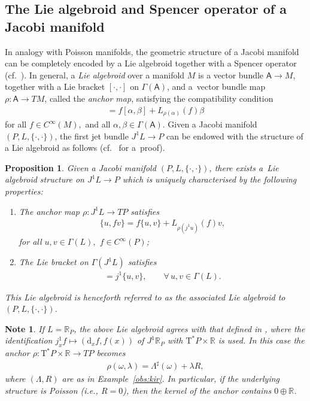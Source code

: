 \documentclass[10pt,a4paper]{amsart}
\numberwithin{equation}{section}
\newtheorem{Proposition}[Theorem]{Proposition}
\newtheorem{Note}[Theorem]{Note}
\newcommand{\de}{\mathrm{d}} %
\newcommand{\cotan}{\mathrm{T}^*} %
\newcommand{\RR}{\mathbb{R}}
\begin{document}
\subsection{The Lie algebroid and Spencer operator of a Jacobi manifold}\label{sec:lie-algebr-assoc}
In analogy with Poisson manifolds, the geometric structure of a Jacobi manifold can be completely encoded by a Lie algebroid together with a Spencer operator (cf.\ \cite{Maria-Crainic,Maria,Dazord,Kerbrat}). In general, a {\it Lie algebroid} over a manifold $M$ is a vector bundle $\mathsf{A} \to M$, together with a Lie bracket $[\cdot,\cdot]$ on $\Gamma(\mathsf{A})$, and a~vector bundle map $\rho\colon \mathsf{A}\to TM$, called the {\it anchor map}, satisfying the compatibility condition
\begin{gather*}[\alpha,f\beta]=f[\alpha,\beta]+L_{\rho(\alpha)}(f)\beta\end{gather*}
for all $f\in C^{\infty}(M),$ and all $\alpha,\beta \in \Gamma(\mathsf{A})$. Given a Jacobi manifold $(P,L,\{\cdot,\cdot\})$, the f\/irst jet bundle $J^1 L \to P$ can be endowed with the structure of a Lie algebroid as follows (cf.~\cite{Maria-Crainic} for a~proof).

\begin{Proposition}\label{prop:alg}
Given a Jacobi manifold $(P, L,\{\cdot,\cdot\})$, there exists a~Lie algebroid structure on $J^1 L \to P$ which is uniquely characterised by the following properties:
 \begin{enumerate}[label={\rm (\Roman*)}, ref={\rm (\Roman*)}]\itemsep=0pt
 \item\label{item:A} The anchor map $\rho\colon J^1 L\to T P$ satisfies
 \begin{gather*}\{u,fv\}=f\{u,v\}+L_{\rho(j^1u)}(f)v,\end{gather*}
 for all $u,v\in\Gamma(L),$ $f\in C^\infty(P)$;
 \item\label{item:B} The Lie bracket on $\Gamma(J^1 L)$ satisfies
 \begin{gather*}[j^1u,j^1v]=j^1\{u,v\},\qquad \forall \, u,v\in\Gamma(L).\end{gather*}
 \end{enumerate}
 This Lie algebroid is henceforth referred to as the associated Lie algebroid to $(P,L,\{\cdot,\cdot\})$.
\end{Proposition}

\begin{Note}\label{obs:trivial_case} If $L=\RR_P$, the above Lie algebroid agrees with that def\/ined in \cite[Def\/inition~1.4]{jacobi}, where the identif\/ication $j^1_xf\mapsto (\de_x f,f(x))$ of $J^1\RR_P$ with $\cotan P\times\RR $ is used. In this case the anchor $\rho\colon \cotan P\times\RR\to TP$ becomes
 \begin{gather*}\rho(\omega,\lambda)=\Lambda^\sharp(\omega)+\lambda R,\end{gather*}
where $(\Lambda,R)$ are as in Example~\ref{obs:kir}. In particular, if the underlying structure is Poisson (i.e., $R=0$), then the kernel of the anchor contains $0 \oplus \RR$.
\end{Note}
\end{document}
